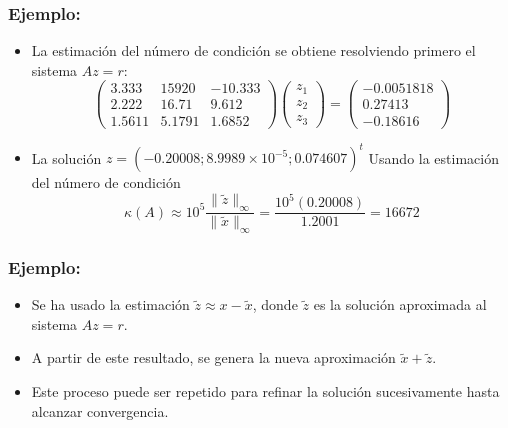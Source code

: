 \documentclass{beamer}
\begin{document}
  \begin{frame}
    \frametitle{Ejemplo:}
    \begin{itemize}
      \item<1-> La estimaci\'on del n\'umero de condici\'on se obtiene resolviendo primero el sistema $A z = r$:      
      $$
      \left(\begin{array}{ccc}
             3.333 & 15920 & -10.333\\
             2.222 & 16.71 & 9.612\\
             1.5611 & 5.1791 & 1.6852
            \end{array}\right)\left(\begin{array}{c}
            z_1\\
            z_2\\
            z_3
            \end{array}\right)=\left(\begin{array}{c}
          -0.0051818\\
          0.27413\\
          -0.18616
            \end{array}\right)
      $$
      \item <2-> La soluci\'on $z = (-0.20008; 8.9989 \times 10^{-5}; 0.074607)^t$ Usando la estimaci\'on del n\'umero de condici\'on      
       $$
       \kappa(A) \approx 10^5\frac{\|\tilde z\|_{\infty}}{\|\tilde x\|_{\infty}} = \frac{10^5(0.20008)}{1.2001} = 16672
       $$
      \end{itemize}
    \end{frame}
  \begin{frame}
    \frametitle{Ejemplo:}
    \begin{itemize}
      \item<1-> Se ha usado la estimaci\'on $\tilde z \approx x - \tilde x$, donde $\tilde z$ es la soluci\'on aproximada al sistema $A z = r$.
      \item<2-> A partir de este resultado, se genera la nueva aproximaci\'on $\tilde x + \tilde z$.
      \item<3-> Este proceso puede ser repetido para refinar la soluci\'on sucesivamente hasta alcanzar convergencia.
    \end{itemize}
  \end{frame}
\end{document}
